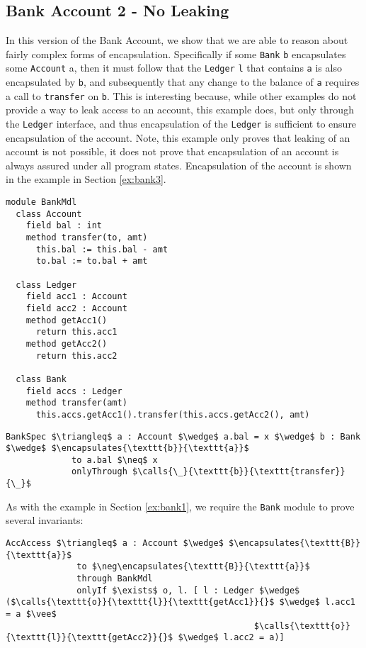 \newpage

\subsection{Bank Account 2 - No Leaking} 
\label{ex:bank2}
In this version of the Bank Account, we show that we 
are able to reason about fairly complex forms of encapsulation.
Specifically if some \texttt{Bank} \texttt{b} encapsulates
some \texttt{Account} a, then it must follow that 
the \texttt{Ledger} \texttt{l} that contains \texttt{a}
is also encapsulated by \texttt{b}, and subsequently that any change to
the balance of \texttt{a} requires a call to \texttt{transfer}
on \texttt{b}. This is interesting because, while other examples
do not provide a way to leak access to an account, this example 
does, but only through the \texttt{Ledger} interface, and thus
encapsulation of the \texttt{Ledger} is sufficient to ensure
encapsulation of the account. Note, this example only proves 
that leaking of an account is not possible, it does not prove 
that encapsulation of an account is always assured under all 
program states. Encapsulation of the account is shown in the
example in Section \ref{ex:bank3}.
\begin{lstlisting}[mathescape=true, frame=lines]
module BankMdl
  class Account
    field bal : int
    method transfer(to, amt)
      this.bal := this.bal - amt
      to.bal := to.bal + amt

  class Ledger
    field acc1 : Account
    field acc2 : Account
    method getAcc1()
      return this.acc1
    method getAcc2()
      return this.acc2

  class Bank
    field accs : Ledger
    method transfer(amt)
      this.accs.getAcc1().transfer(this.accs.getAcc2(), amt)
\end{lstlisting}
\begin{lstlisting}[language = Chainmail, mathescape=true, frame=lines]
BankSpec $\triangleq$ a : Account $\wedge$ a.bal = x $\wedge$ b : Bank $\wedge$ $\encapsulates{\texttt{b}}{\texttt{a}}$
             to a.bal $\neq$ x
             onlyThrough $\calls{\_}{\texttt{b}}{\texttt{transfer}}{\_}$
\end{lstlisting}
As with the example in Section \ref{ex:bank1}, we require 
the \verb|Bank| module to prove several invariants:
\begin{lstlisting}[language = Chainmail, mathescape=true, frame=lines]
AccAccess $\triangleq$ a : Account $\wedge$ $\encapsulates{\texttt{B}}{\texttt{a}}$
              to $\neg\encapsulates{\texttt{B}}{\texttt{a}}$
              through BankMdl
              onlyIf $\exists$ o, l. [ l : Ledger $\wedge$ ($\calls{\texttt{o}}{\texttt{l}}{\texttt{getAcc1}}{}$ $\wedge$ l.acc1 = a $\vee$ 
                                                 $\calls{\texttt{o}}{\texttt{l}}{\texttt{getAcc2}}{}$ $\wedge$ l.acc2 = a)]
\end{lstlisting}
